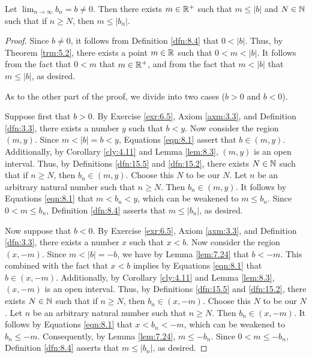 \documentclass[../main.tex]{subfiles}
\begin{document}
\begin{theorem}
\begin{enumerate}[resume,label={\textup{(}\alph*\textup{)}},ref={\thetheorem\alph*}]
        \begin{lemma*}
            Let $\lim_{n\to\infty}b_n=b\neq 0$. Then there exists $m\in\mathbb{R}^+$ such that $m\leq|b|$ and $N\in\mathbb{N}$ such that if $n\geq N$, then $m\leq|b_n|$.
            \begin{proof}
                Since $b\neq 0$, it follows from Definition \ref{dfn:8.4} that $0<|b|$. Thus, by Theorem \ref{trm:5.2}, there exists a point $m\in\mathbb{R}$ such that $0<m<|b|$. It follows from the fact that $0<m$ that $m\in\mathbb{R}^+$, and from the fact that $m<|b|$ that $m\leq|b|$, as desired.\par\smallskip
                As to the other part of the proof, we divide into two cases ($b>0$ and $b<0$).\par
                Suppose first that $b>0$. By Exercise \ref{exr:6.5}, Axiom \ref{axm:3.3}, and Definition \ref{dfn:3.3}, there exists a number $y$ such that $b<y$. Now consider the region $(m,y)$. Since $m<|b|=b<y$, Equations \ref{eqn:8.1} assert that $b\in(m,y)$. Additionally, by Corollary \ref{cly:4.11} and Lemma \ref{lem:8.3}, $(m,y)$ is an open interval. Thus, by Definitions \ref{dfn:15.5} and \ref{dfn:15.2}, there exists $N\in\mathbb{N}$ such that if $n\geq N$, then $b_n\in(m,y)$. Choose this $N$ to be our $N$. Let $n$ be an arbitrary natural number such that $n\geq N$. Then $b_n\in(m,y)$. It follows by Equations \ref{eqn:8.1} that $m<b_n<y$, which can be weakened to $m\leq b_n$. Since $0<m\leq b_n$, Definition \ref{dfn:8.4} asserts that $m\leq|b_n|$, as desired.\par
                Now suppose that $b<0$. By Exercise \ref{exr:6.5}, Axiom \ref{axm:3.3}, and Definition \ref{dfn:3.3}, there exists a number $x$ such that $x<b$. Now consider the region $(x,-m)$. Since $m<|b|=-b$, we have by Lemma \ref{lem:7.24} that $b<-m$. This combined with the fact that $x<b$ implies by Equations \ref{eqn:8.1} that $b\in(x,-m)$. Additionally, by Corollary \ref{cly:4.11} and Lemma \ref{lem:8.3}, $(x,-m)$ is an open interval. Thus, by Definitions \ref{dfn:15.5} and \ref{dfn:15.2}, there exists $N\in\mathbb{N}$ such that if $n\geq N$, then $b_n\in(x,-m)$. Choose this $N$ to be our $N$. Let $n$ be an arbitrary natural number such that $n\geq N$. Then $b_n\in(x,-m)$. It follows by Equations \ref{eqn:8.1} that $x<b_n<-m$, which can be weakened to $b_n\leq -m$. Consequently, by Lemma \ref{lem:7.24}, $m\leq -b_n$. Since $0<m\leq -b_n$, Definition \ref{dfn:8.4} asserts that $m\leq|b_n|$, as desired.
            \end{proof}
        \end{lemma*}

\end{enumerate}
\end{theorem}
\end{document}
